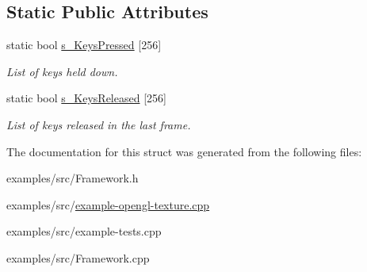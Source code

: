 \subsection*{Static Public Attributes}
\begin{DoxyCompactItemize}
\item 
\hypertarget{struct_t_i_l_f_w_1_1_framework_a36e2f073c0d10ce62ee0baf813b60d00}{
static bool \hyperlink{struct_t_i_l_f_w_1_1_framework_a36e2f073c0d10ce62ee0baf813b60d00}{s\_\-KeysPressed} \mbox{[}256\mbox{]}}
\label{struct_t_i_l_f_w_1_1_framework_a36e2f073c0d10ce62ee0baf813b60d00}

\begin{DoxyCompactList}\small\item\em List of keys held down. \item\end{DoxyCompactList}\item 
\hypertarget{struct_t_i_l_f_w_1_1_framework_a64f626069888ea204f062e746b5deff2}{
static bool \hyperlink{struct_t_i_l_f_w_1_1_framework_a64f626069888ea204f062e746b5deff2}{s\_\-KeysReleased} \mbox{[}256\mbox{]}}
\label{struct_t_i_l_f_w_1_1_framework_a64f626069888ea204f062e746b5deff2}

\begin{DoxyCompactList}\small\item\em List of keys released in the last frame. \item\end{DoxyCompactList}\end{DoxyCompactItemize}


The documentation for this struct was generated from the following files:\begin{DoxyCompactItemize}
\item 
examples/src/Framework.h\item 
examples/src/\hyperlink{example-opengl-texture_8cpp}{example-\/opengl-\/texture.cpp}\item 
examples/src/example-\/tests.cpp\item 
examples/src/Framework.cpp\end{DoxyCompactItemize}
